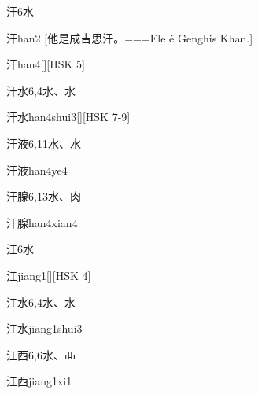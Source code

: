 \begin{Entry}{汗}{6}{⽔}
  \begin{Phonetics}{汗}{han2}
    [他是成吉思汗。===Ele é Genghis Khan.]
  \end{Phonetics}
  \begin{Phonetics}{汗}{han4}[][HSK 5]
  \end{Phonetics}
\end{Entry}

\begin{Entry}{汗水}{6,4}{⽔、⽔}
  \begin{Phonetics}{汗水}{han4shui3}[][HSK 7-9]
  \end{Phonetics}
\end{Entry}

\begin{Entry}{汗液}{6,11}{⽔、⽔}
  \begin{Phonetics}{汗液}{han4ye4}
  \end{Phonetics}
\end{Entry}

\begin{Entry}{汗腺}{6,13}{⽔、⾁}
  \begin{Phonetics}{汗腺}{han4xian4}
  \end{Phonetics}
\end{Entry}

\begin{Entry}{江}{6}{⽔}
  \begin{Phonetics}{江}{jiang1}[][HSK 4]
  \end{Phonetics}
\end{Entry}

\begin{Entry}{江水}{6,4}{⽔、⽔}
  \begin{Phonetics}{江水}{jiang1shui3}
  \end{Phonetics}
\end{Entry}

\begin{Entry}{江西}{6,6}{⽔、⾑}
  \begin{Phonetics}{江西}{jiang1xi1}
  \end{Phonetics}
\end{Entry}

